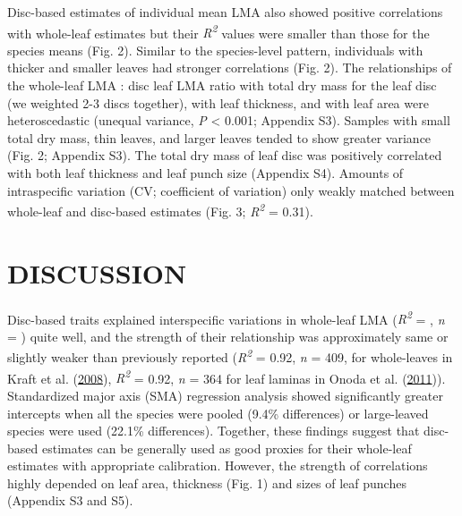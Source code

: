 \documentclass[
  12pt,
  a4paper,
,tablecaptionabove
]{scrartcl}
\begin{document}
Disc-based estimates of individual mean LMA also showed positive
correlations with whole-leaf estimates but their
\emph{R\textsuperscript{2}} values were smaller than those for the
species means (Fig. 2). Similar to the species-level pattern,
individuals with thicker and smaller leaves had stronger correlations
(Fig. 2). The relationships of the whole-leaf LMA : disc leaf LMA ratio
with total dry mass for the leaf disc (we weighted 2-3 discs together),
with leaf thickness, and with leaf area were heteroscedastic (unequal
variance, \emph{P} \textless{} 0.001; Appendix S3). Samples with small
total dry mass, thin leaves, and larger leaves tended to show greater
variance (Fig. 2; Appendix S3). The total dry mass of leaf disc was
positively correlated with both leaf thickness and leaf punch size
(Appendix S4). Amounts of intraspecific variation (CV; coefficient of
variation) only weakly matched between whole-leaf and disc-based
estimates (Fig. 3; \emph{R\textsuperscript{2}} = 0.31).

\hypertarget{discussion}{%
\section{DISCUSSION}\label{discussion}}

Disc-based traits explained interspecific variations in whole-leaf LMA
(\emph{R\textsuperscript{2}} = , \emph{n} = ) quite well, and the
strength of their relationship was approximately same or slightly weaker
than previously reported (\emph{R\textsuperscript{2}} = 0.92, \emph{n} =
409, for whole-leaves in Kraft et al.
(\protect\hyperlink{ref-Kraft2008}{2008}), \emph{R\textsuperscript{2}} =
0.92, \emph{n} = 364 for leaf laminas in Onoda et al.
(\protect\hyperlink{ref-Onoda2011}{2011})). Standardized major axis
(SMA) regression analysis showed significantly greater intercepts when
all the species were pooled (9.4\% differences) or large-leaved species
were used (22.1\% differences). Together, these findings suggest that
disc-based estimates can be generally used as good proxies for their
whole-leaf estimates with appropriate calibration. However, the strength
of correlations highly depended on leaf area, thickness (Fig. 1) and
sizes of leaf punches (Appendix S3 and S5).
\end{document}
